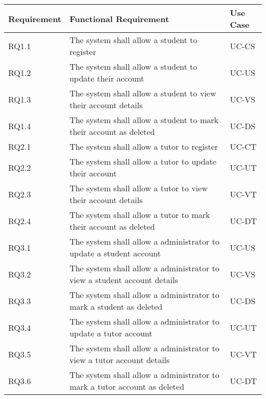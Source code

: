 \documentclass[12pt]{article}
\begin{document}
{
\centering
\begin{tabular}{| l | p{10cm}| l |}
			\hline			
			\textbf{Requirement} & \textbf{Functional Requirement} & \textbf{Use Case}
			
			\\ \hline RQ1.1 & The system shall allow a student to register  & UC-CS \\ \hline 
			RQ1.2 & The system shall allow a student to update their account & UC-US \\ \hline  
			RQ1.3 & The system shall allow a student to view their account details  & UC-VS \\ \hline 
			RQ1.4 & The system shall allow a student to mark their account as deleted & UC-DS  \\ \hline 
			RQ2.1 & The system shall allow a tutor to register & UC-CT \\ \hline
			RQ2.2 & The system shall allow a tutor to update their account  & UC-UT \\ \hline
			RQ2.3 & The system shall allow a tutor to view their account details & UC-VT \\ \hline
			RQ2.4 & The system shall allow a tutor to mark their account as deleted & UC-DT \\ \hline  
			
			RQ3.1 & The system shall allow a administrator to update a student account & UC-US \\ \hline  
			RQ3.2 & The system shall allow a administrator to view a student account details  & UC-VS \\ \hline 
			RQ3.3 & The system shall allow a administrator to mark a student as deleted & UC-DS  \\ \hline 
			RQ3.4 & The system shall allow a administrator to update a tutor account  & UC-UT \\ \hline
			RQ3.5 & The system shall allow a administrator to view a tutor account details & UC-VT \\ \hline
			RQ3.6 & The system shall allow a administrator to mark a tutor account as deleted & UC-DT \\ \hline			
			
\end{tabular}
}
\end{document}
